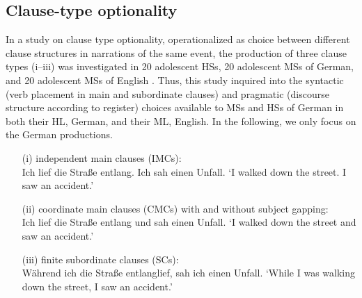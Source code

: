 \documentclass[output=paper]{langscibook}
\begin{document}
\subsection{ Clause-type optionality}
\label{sec:tsehaye:5.1}
In a study on clause type optionality, operationalized as choice between different clause structures in narrations of the same event, the production of three clause types (i--iii) was investigated in 20 adolescent HSs, 20 adolescent MSs of German, and 20 adolescent MSs of English \citep{PashkovaEtAl2022}. Thus, this study inquired into the syntactic (verb placement in main and subordinate clauses) and pragmatic (discourse structure according to register) choices available to MSs and HSs of German in both their HL, German, and their ML, English. In the following, we only focus on the German productions.

\begin{itemize}
\item[(i)] independent main clauses (IMCs):\\
		   Ich lief die Straße entlang. Ich sah einen Unfall.
		  \glt ‘I walked down the street. I saw an accident.’

\item[(ii)] coordinate main clauses (CMCs) with and without subject gapping:\\
		    Ich lief die Straße entlang und sah einen Unfall.
		    \glt ‘I walked down the street and saw an accident.’

\item[(iii)] finite subordinate clauses (SCs):\\
			Während ich die Straße entlanglief, sah ich einen Unfall.
			\glt  ‘While I was walking down the street, I saw an accident.’
\end{itemize}
\end{document}
